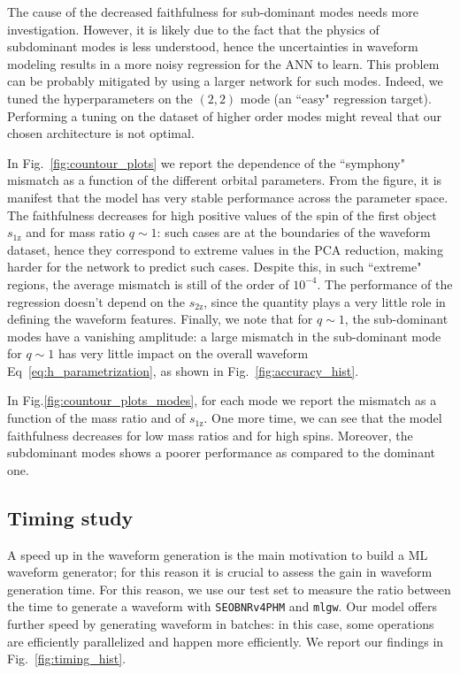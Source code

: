 \documentclass[twocolumn,showpacs,preprintnumbers,nofootinbib,prd,
superscriptaddress,10pt]{revtex4-1}
\begin{document}
{The cause of the decreased faithfulness for sub-dominant modes needs more investigation. However, it is likely due to the fact that the physics of subdominant modes is less understood, hence the uncertainties in waveform modeling results in a more noisy regression for the ANN to learn.
This problem can be probably mitigated by using a larger network for such modes. Indeed, we tuned the hyperparameters on the $(2,2)$ mode (an ``easy" regression target). Performing a tuning on the dataset of higher order modes might reveal that our chosen architecture is not optimal.

In Fig.~\ref{fig:countour_plots} we report the dependence of the ``symphony" mismatch as a function of the different orbital parameters.
From the figure, it is manifest that the model has very stable performance across the parameter space.
The faithfulness decreases for high positive values of the spin of the first object $s_\text{1z}$ and for mass ratio $q\sim 1$: such cases are at the boundaries of the waveform dataset, hence they correspond to extreme values in the PCA reduction, making harder for the network to predict such cases. Despite this, in such ``extreme" regions, the average mismatch is still of the order of $10^{-4}$.
The performance of the regression doesn't depend on the $s_\text{2z}$, since the quantity plays a very little role in defining the waveform features.
Finally, we note that for $q\sim 1$, the sub-dominant modes have a vanishing amplitude: a large mismatch in the sub-dominant mode for $q\sim 1$ has very little impact on the overall waveform Eq~\eqref{eq:h_parametrization}, as shown in Fig.~\ref{fig:accuracy_hist}.

In Fig.\ref{fig:countour_plots_modes}, for each mode we report the mismatch as a function of the mass ratio and of $s_\text{1z}$. One more time, we can see that the model faithfulness decreases for low mass ratios and for high spins. Moreover, the subdominant modes shows a poorer performance as compared to the dominant one.

\subsection{Timing study}
\label{sec:timing}

A speed up in the waveform generation is the main motivation to build a ML waveform generator; for this reason it is crucial to assess the gain in waveform generation time.
For this reason, we use our test set to measure the ratio between the time to generate a waveform with \texttt{SEOBNRv4PHM} and \texttt{mlgw}. Our model offers further speed by generating waveform in batches: in this case, some operations are efficiently parallelized and happen more efficiently.
We report our findings in Fig.~\ref{fig:timing_hist}.

}
\end{document}
